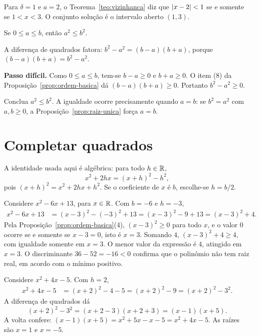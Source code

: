 \documentclass[11pt,a4paper]{article}
\begin{document}
\begin{exemplo}
Para $\delta=1$ e $a=2$, o Teorema~\ref{teo:vizinhanca} diz que $\left\lvert x-2 \right\rvert<1$ se e somente se $1<x<3$. O conjunto solução é o intervalo aberto $(1,3)$.
\end{exemplo}


\begin{lema}\label{lem:quadrados}
Se $0\le a\le b$, então $a^2\le b^2$.
\end{lema}

\begin{esqueleto}
\item A diferença de quadrados fatora: $b^2-a^2=(b-a)(b+a)$, porque $(b-a)(b+a)=b^2-a^2$.
\item \textbf{Passo difícil.} Como $0\le a\le b$, tem-se $b-a\ge 0$ e $b+a\ge 0$. O item (8) da Proposição~\ref{prop:ordem-basica} dá $(b-a)(b+a)\ge 0$. Portanto $b^2-a^2\ge 0$.
\item Conclua $a^2\le b^2$. A igualdade ocorre precisamente quando $a=b$: se $b^2=a^2$ com $a,b\ge 0$, a Proposição~\ref{prop:raiz-unica} força $a=b$.
\end{esqueleto}

\section{Completar quadrados}

A identidade usada aqui é algébrica: para todo $h\in\mathbb{R}$,
\[
x^2+2hx=(x+h)^2-h^2,
\]
pois $(x+h)^2=x^2+2hx+h^2$. Se o coeficiente de $x$ é $b$, escolhe-se $h=b/2$.

\begin{exemplo}[Mínimo]
Considere $x^2-6x+13$, para $x\in\mathbb{R}$. Com $b=-6$ e $h=-3$,
\begin{align*}
x^2-6x+13
&=(x-3)^2-(-3)^2+13
=(x-3)^2-9+13
=(x-3)^2+4.
\end{align*}
Pela Proposição~\ref{prop:ordem-basica}(4), $(x-3)^2\ge 0$ para todo $x$, e o valor $0$ ocorre se e somente se $x-3=0$, isto é $x=3$. Somando $4$, $(x-3)^2+4\ge 4$, com igualdade somente em $x=3$. O menor valor da expressão é $4$, atingido em $x=3$. O discriminante $36-52=-16<0$ confirma que o polinômio não tem raiz real, em acordo com o mínimo positivo.
\end{exemplo}

\begin{exemplo}[Fatoração]
Considere $x^2+4x-5$. Com $h=2$,
\begin{align*}
x^2+4x-5
&=(x+2)^2-4-5
=(x+2)^2-9
=(x+2)^2-3^2.
\end{align*}
A diferença de quadrados dá
\[
(x+2)^2-3^2=(x+2-3)(x+2+3)=(x-1)(x+5).
\]
A volta confere: $(x-1)(x+5)=x^2+5x-x-5=x^2+4x-5$. As raízes são $x=1$ e $x=-5$.
\end{exemplo}
\end{document}
